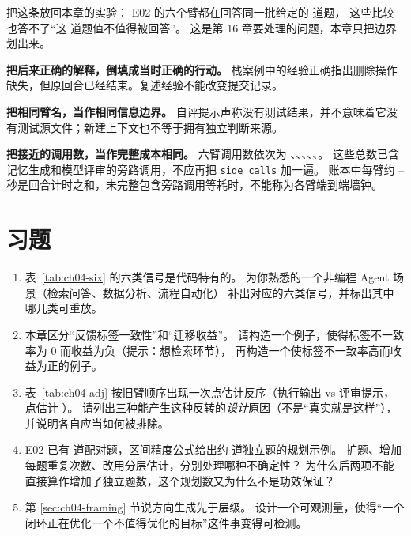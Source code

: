 把这条放回本章的实验：
E02 的六个臂都在回答同一批给定的  道题，
这些比较也答不了“这  道题值不值得被回答”。
这是第 16 章要处理的问题，本章只把边界划出来。

\begin{pitfallbox}
\textbf{把后来正确的解释，倒填成当时正确的行动。}
栈案例中的经验正确指出删除操作缺失，但原回合已经结束。复述经验不能改变提交记录。

\textbf{把相同臂名，当作相同信息边界。}
自评提示声称没有测试结果，并不意味着它没有测试源文件；新建上下文也不等于拥有独立判断来源。

\textbf{把接近的调用数，当作完整成本相同。}
六臂调用数依次为 、、、、、。
这些总数已含记忆生成和模型评审的旁路调用，不应再把 \texttt{side\_calls} 加一遍。
账本中每臂约 -- 秒是回合计时之和，未完整包含旁路调用等耗时，不能称为各臂端到端墙钟。
\end{pitfallbox}

\section*{习题}
\begin{enumerate}[label=4-\arabic*.,ref=4-\arabic*]
  \item\label{ex:ch04-1} 表~\ref{tab:ch04-six} 的六类信号是代码特有的。
        为你熟悉的一个非编程 Agent 场景（检索问答、数据分析、流程自动化）
        补出对应的六类信号，并标出其中哪几类可重放。
  \item\label{ex:ch04-2} 本章区分“反馈标签一致性”和“迁移收益”。
        请构造一个例子，使得标签不一致率为 0 而收益为负（提示：想检索环节），
        再构造一个使标签不一致率高而收益为正的例子。
  \item\label{ex:ch04-3} 表~\ref{tab:ch04-adj} 按旧臂顺序出现一次点估计反序（执行输出 vs 评审提示，
        点估计 ）。
        请列出三种能产生这种反转的\emph{设计}原因（不是“真实就是这样”），
        并说明各自应当如何被排除。
  \item\leavevmode\label{ex:ch04-4}E02 已有  道配对题，区间精度公式给出约  道独立题的规划示例。
        扩题、增加每题重复次数、改用分层估计，分别处理哪种不确定性？
        为什么后两项不能直接算作增加了独立题数，这个规划数又为什么不是功效保证？
  \item\label{ex:ch04-5} 第 \ref{sec:ch04-framing} 节说方向生成先于层级。
        设计一个可观测量，使得“一个闭环正在优化一个不值得优化的目标”这件事变得可检测。
\end{enumerate}

